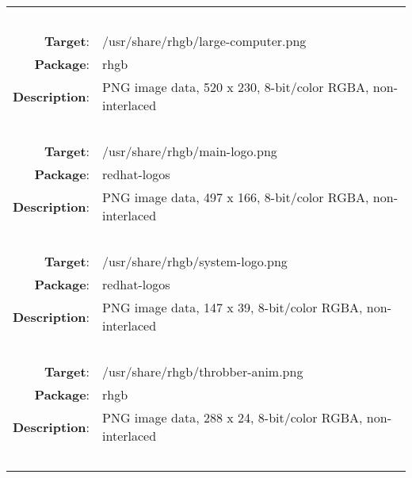 \begin{longtable}{rl}
\hline
\multicolumn{2}{l}{\ }\\
\textbf{Target}: & /usr/share/rhgb/large-computer.png\\
\textbf{Package}: & rhgb\\
\textbf{Description}: & PNG image data, 520 x 230, 8-bit/color RGBA, non-interlaced\\
\multicolumn{2}{l}{\ }\\
\textbf{Target}: & /usr/share/rhgb/main-logo.png\\
\textbf{Package}: & redhat-logos\\
\textbf{Description}: & PNG image data, 497 x 166, 8-bit/color RGBA, non-interlaced\\
\multicolumn{2}{l}{\ }\\
\textbf{Target}: & /usr/share/rhgb/system-logo.png\\
\textbf{Package}: & redhat-logos\\
\textbf{Description}: & PNG image data, 147 x 39, 8-bit/color RGBA, non-interlaced\\
\multicolumn{2}{l}{\ }\\
\textbf{Target}: & /usr/share/rhgb/throbber-anim.png\\
\textbf{Package}: & rhgb\\
\textbf{Description}: & PNG image data, 288 x 24, 8-bit/color RGBA, non-interlaced\\
\multicolumn{2}{l}{\ }\\
\hline
\end{longtable}
